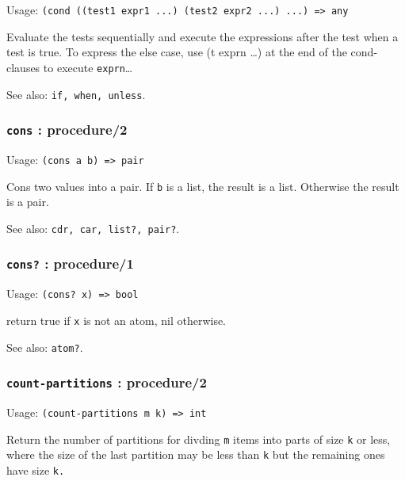 \documentclass[
]{article}
\newcommand{\passthrough}[1]{#1}
\begin{document}
Usage:
\passthrough{\lstinline!(cond ((test1 expr1 ...) (test2 expr2 ...) ...) => any!}

Evaluate the tests sequentially and execute the expressions after the
test when a test is true. To express the else case, use (t exprn \ldots)
at the end of the cond-clauses to execute
\passthrough{\lstinline!exprn!}\ldots{}

See also: \passthrough{\lstinline!if, when, unless!}.

\hypertarget{cons-procedure2}{%
\subsubsection{\texorpdfstring{\texttt{cons} :
procedure/2}{cons : procedure/2}}\label{cons-procedure2}}

Usage: \passthrough{\lstinline!(cons a b) => pair!}

Cons two values into a pair. If \passthrough{\lstinline!b!} is a list,
the result is a list. Otherwise the result is a pair.

See also: \passthrough{\lstinline!cdr, car, list?, pair?!}.

\hypertarget{cons-procedure1}{%
\subsubsection{\texorpdfstring{\texttt{cons?} :
procedure/1}{cons? : procedure/1}}\label{cons-procedure1}}

Usage: \passthrough{\lstinline!(cons? x) => bool!}

return true if \passthrough{\lstinline!x!} is not an atom, nil
otherwise.

See also: \passthrough{\lstinline!atom?!}.

\hypertarget{count-partitions-procedure2}{%
\subsubsection{\texorpdfstring{\texttt{count-partitions} :
procedure/2}{count-partitions : procedure/2}}\label{count-partitions-procedure2}}

Usage: \passthrough{\lstinline!(count-partitions m k) => int!}

Return the number of partitions for divding \passthrough{\lstinline!m!}
items into parts of size \passthrough{\lstinline!k!} or less, where the
size of the last partition may be less than \passthrough{\lstinline!k!}
but the remaining ones have size \passthrough{\lstinline!k.!}
\end{document}
